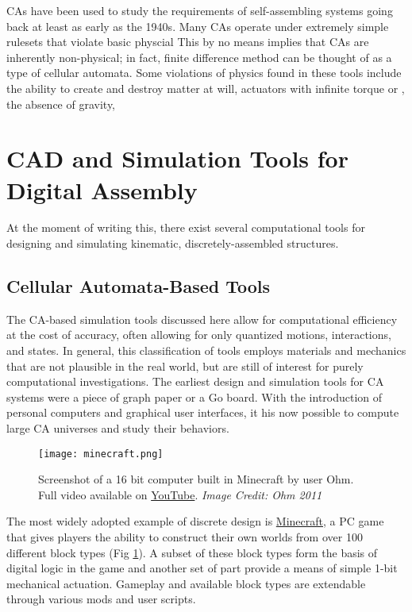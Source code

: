 {CAs have been used to study the requirements of self-assembling systems going back at least as early as the 1940s\cite{Neumann1966}.
Many CAs operate under extremely simple rulesets that violate basic physcial 
This by no means implies that CAs are inherently non-physical; in fact, finite difference method can be thought of as a type of cellular automata\cite{Yang2010}.
Some violations of physics found in these tools include the ability to create and destroy matter at will, actuators with infinite torque or , the absence of gravity, 


\section{CAD and Simulation Tools for Digital Assembly}

At the moment of writing this, there exist several computational tools for designing and simulating kinematic, discretely-assembled structures.

\subsection{Cellular Automata-Based Tools}

The CA-based simulation tools discussed here allow for computational efficiency at the cost of accuracy, often allowing for only quantized motions, interactions, and states.  In general, this classification of tools employs materials and mechanics that are not plausible in the real world, but are still of interest for purely computational investigations.  The earliest design and simulation tools for CA systems were a piece of graph paper or a Go board\cite{Gardner1970}.  With the introduction of personal computers and graphical user interfaces, it his now possible to compute large CA universes and study their behaviors.\\

\begin{figure}
  \texttt{[image: minecraft.png]}
  \caption{Screenshot of a 16 bit computer built in Minecraft by user Ohm.  Full video available on \href{https://www.youtube.com/watch?v=KzrFzkb3A4o}{YouTube}. \textit{Image Credit: Ohm 2011}}
  \label{fig:minecraft}
\end{figure}
The most widely adopted example of discrete design is \href{https://minecraft.net/}{Minecraft}, a PC game that gives players the ability to construct their own worlds from over 100 different block types (Fig \ref{fig:minecraft}).  A subset of these block types form the basis of digital logic in the game and another set of part provide a means of simple 1-bit mechanical actuation\cite{MinecraftWik2016}.  Gameplay and available block types are extendable through various mods and user scripts.
\\

}
